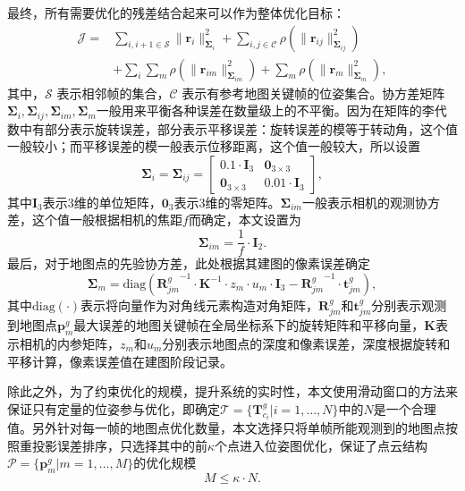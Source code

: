 最终，所有需要优化的残差结合起来可以作为整体优化目标：
\begin{equation}
\begin{aligned}
  \mathcal{J} = & \sum_{i,i+1\in\mathcal{S}}\|\symbf{r}_i\|_{\symbf{\Sigma}_{i}}^2 + \sum_{i,j\in\mathcal{C}}\rho(\|\symbf{r}_{ij}\|_{\symbf{\Sigma}_{ij}}^2) \\ 
  &+ \sum_i \sum_m \rho(\| \symbf{r}_{im} \|_{\symbf{\Sigma}_{im}}^2) + \sum_m \rho(\| \symbf{r}_m \|_{\symbf{\Sigma}_{m}}^2),
\end{aligned}
\end{equation}
其中，$\mathcal{S}$ 表示相邻帧的集合，$\mathcal{C}$ 表示有参考地图关键帧的位姿集合。协方差矩阵$\symbf{\Sigma}_{i},\symbf{\Sigma}_{ij},\symbf{\Sigma}_{im},\symbf{\Sigma}_{m}$一般用来平衡各种误差在数量级上的不平衡。因为在矩阵的李代数中有部分表示旋转误差，部分表示平移误差：旋转误差的模等于转动角，这个值一般较小；而平移误差的模一般表示位移距离，这个值一般较大，所以设置
\begin{equation}
  \symbf{\Sigma}_{i} = \symbf{\Sigma}_{ij} = 
  \begin{bmatrix}
    0.1 \cdot \symbf{I}_3 & \symbf{0}_{3\times 3} \\
    \symbf{0}_{3\times 3} & 0.01 \cdot \symbf{I}_3
  \end{bmatrix},
\end{equation}
其中$\symbf{I}_3$表示3维的单位矩阵，$\symbf{0}_3$表示3维的零矩阵。$\symbf{\Sigma}_{im}$一般表示相机的观测协方差，这个值一般根据相机的焦距$f$而确定，本文设置为
\begin{equation}
  \symbf{\Sigma}_{im} = \frac{1}{f} \cdot \symbf{I}_2.
\end{equation}
最后，对于地图点的先验协方差，此处根据其建图的像素误差确定
\begin{equation}
  \symbf{\Sigma}_{m} = \text{diag}({\symbf{R}_{jm}^g}^{-1}\cdot\symbf{K}^{-1}\cdot z_m \cdot u_m \cdot \symbf{I}_3 - {\symbf{R}_{jm}^g}^{-1}\cdot\symbf{t}_{jm}^g),
\end{equation}
其中$\text{diag}(\cdot)$表示将向量作为对角线元素构造对角矩阵，$\symbf{R}_{jm}^g$和$\symbf{t}_{jm}^g$分别表示观测到地图点$\symbf{p}_m^g$最大误差的地图关键帧在全局坐标系下的旋转矩阵和平移向量，$\symbf{K}$表示相机的内参矩阵，$z_m$和$u_m$分别表示地图点的深度和像素误差，深度根据旋转和平移计算，像素误差值在建图阶段记录。

除此之外，为了约束优化的规模，提升系统的实时性，本文使用滑动窗口的方法来保证只有定量的位姿参与优化，即确定$\mathcal{T} = \{ \symbf{T}_{c_i}^g | i=1,\dots, N\}$中的$N$是一个合理值。另外针对每一帧的地图点优化数量，本文选择只将单帧所能观测到的地图点按照重投影误差排序，只选择其中的前$\kappa$个点进入位姿图优化，保证了点云结构$\mathcal{P} = \{\symbf{p}^g_m | m = 1, \dots, M\}$的优化规模
\begin{equation}
  M \le \kappa \cdot N.
\end{equation}

